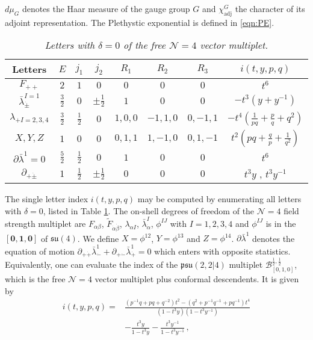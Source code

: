 \documentclass[main.tex]{subfiles}
\begin{document}
$d\mu_{G}$ denotes the Haar measure of the gauge group $G$ and $\chi_{\text{adj}}^{G}$ the character of its adjoint representation. The Plethystic exponential is defined in \eqref{eqn:PE}.
\begin{table}
\centering
\begin{tabular}{|c||c|c|c|c|c|c|c|} 
\hline
\textrm{Letters}  & $E$ & $j_1$ & $j_2$ & $R_1$ & $R_2$ & $R_3$ & $i(t,y,p,q)$\\ 
  \hline\hline
 $F_{++}$ & $2$ & $1$ & $0$ & $0$ & $0$ & $0$ &$t^6$\\ 
 \hline
   $\bar{\lambda}^{I=1}_{\dot{\pm}}$ & $\frac{3}{2}$ & $0$ & $\pm\frac{1}{2}$ & $1$ & $0$ & $0$&$- t^3(y+y^{-1})$\\ 
 \hline
   $\lambda_{+I=2,3,4}$ & $\frac{3}{2}$ & $\frac{1}{2}$ & $0$ & $1,0,0$ & $-1,1,0$ & $0,-1,1$& $-t^4\left(\frac{1}{ pq}+\frac{p}{ q}+ q^2\right)$\\ 
 \hline
    $X,Y,Z$ & $1$ & $0$ & $0$ & $0,1,1$ & $1,-1,0$ & $0,1,-1$ & $t^2\left( pq+\frac{ q}{p}+\frac{1}{ q^2}\right)$\\ 
 \hline\hline
      $\partial\bar{\lambda}^1=0$& $\frac{5}{2}$ & $\frac{1}{2}$ & $0$ & $1$ & $0$ & $0$ &$ t^6$\\ 
 \hline\hline
   $\partial_{+\dot\pm}$ & $1$ & $\frac{1}{2}$ & $\pm\frac{1}{2}$ & $0$ & $0$ & $0$ &$t^3y$ , $t^3y^{-1}$\\ 
 \hline
\end{tabular}
\caption{\textit{Letters with $\delta=0$ of the free $\mathcal{N}=4$ vector multiplet.}}
\label{fig:N4vecletters}
\end{table}
The single letter index $i(t,y,p,q)$ may be computed by enumerating all letters with $\delta=0$, listed in Table \ref{fig:N4vecletters}. The on-shell degrees of freedom of the $\mathcal{N}=4$ field strength multiplet are $F_{\alpha\beta}$, $\widetilde{F}_{\dot\alpha\dot\beta}$, $\lambda_{\alpha I}$, $\bar{\lambda}_{\dot\alpha}^I$, $\phi^{IJ}$ with $I=1,2,3,4$ and $\phi^{IJ}$ is in the $\mathbf{[0,1,0]}$ of $\mathfrak{su}(4)$. We define $X=\phi^{12}$, $Y=\phi^{13}$ and $Z=\phi^{14}$. $\partial\bar{\lambda}^1$ denotes the equation of motion $\partial_{+\dot+}\bar{\lambda}_{\dot{-}}^1+\partial_{+\dot-}\bar{\lambda}^1_{\dot{+}}=0$ which enters with opposite statistics. Equivalently, one can evaluate the index of the $\mathfrak{psu}(2,2|4)$ multiplet $\mathcal{B}_{[0,1,0]}^{\frac{1}{2},\frac{1}{2}}$, which is the free $\mathcal{N}=4$ vector multiplet plus conformal descendents.  It is given by
\begin{equation}\label{eqn:singleletter}
\begin{aligned}
i(t,y,p,q)=&\frac{\left(p^{-1}q+pq+q^{-2}\right)t^2-\left(q^2+p^{-1}q^{-1}+pq^{-1}\right)t^4}{(1-t^3y)(1-t^3y^{-1})} \\
&-\frac{t^3y}{1-t^3y}-\frac{t^3y^{-1}}{1-t^3y^{-1}}\, ,
\end{aligned}
\end{equation}
\end{document}
